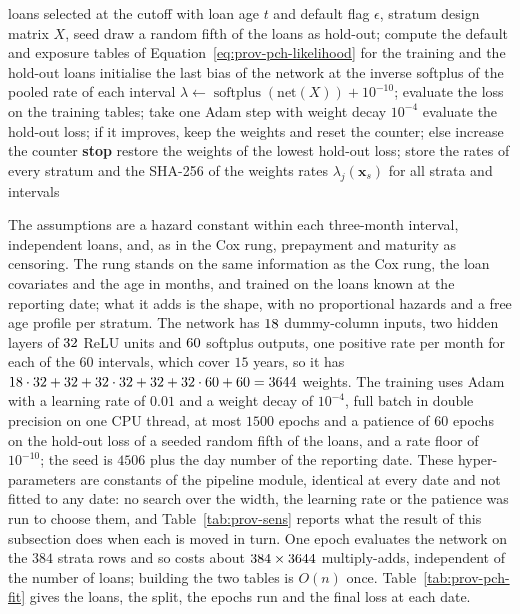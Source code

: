 \begin{algorithm}[htbp]
\caption{Training of the PC-Hazard network at a reporting date.}
\label{alg:prov-pch}
\begin{algorithmic}[1]
\Require loans selected at the cutoff with loan age $t$ and default flag $\epsilon$, stratum design matrix $X$, seed
\State draw a random fifth of the loans as hold-out; compute the default and exposure tables of Equation~\ref{eq:prov-pch-likelihood} for the training and the hold-out loans
\State initialise the last bias of the network at the inverse softplus of the pooled rate of each interval
  \State $\lambda\leftarrow\operatorname{softplus}(\mathrm{net}(X))+10^{-10}$; evaluate the loss on the training tables; take one Adam step with weight decay $10^{-4}$
  \State evaluate the hold-out loss; if it improves, keep the weights and reset the counter; else increase the counter
   \State \textbf{stop} \EndIf
\EndFor
\State restore the weights of the lowest hold-out loss; store the rates of every stratum and the SHA-256 of the weights
\Ensure rates $\lambda_j(\mathbf{x}_s)$ for all strata and intervals
\end{algorithmic}
\end{algorithm}

The assumptions are a hazard constant within each three-month interval, independent loans, and, as in the Cox rung, prepayment and maturity as censoring. The rung stands on the same information as the Cox rung, the loan covariates and the age in months, and trained on the loans known at the reporting date; what it adds is the shape, with no proportional hazards and a free age profile per stratum.
The network has $18$ dummy-column inputs, two hidden layers of $32$ ReLU units and $60$ softplus outputs, one positive rate per month for each of the $60$ intervals, which cover $15$ years, so it has $18\cdot32+32+32\cdot32+32+32\cdot60+60=3644$ weights. The training uses Adam with a learning rate of $0.01$ and a weight decay of
$10^{-4}$, full batch in double precision on one CPU thread, at most $1500$ epochs and a patience of $60$ epochs on the hold-out loss of a seeded random fifth of the loans, and a rate floor of $10^{-10}$; the seed is $4506$ plus the day number of the reporting date. These hyper-parameters are constants of the pipeline module, identical at every date and not fitted to any date: no search over the width, the learning rate or the patience was run to choose them, and Table~\ref{tab:prov-sens} reports what the result of this subsection does when each is moved in turn. One epoch evaluates the network on the $384$ strata rows and so costs about $384\times3644$ multiply-adds, independent of the number of loans; building the two tables is $O(n)$ once. Table~\ref{tab:prov-pch-fit} gives the loans, the split, the epochs run and the final loss at each date.

